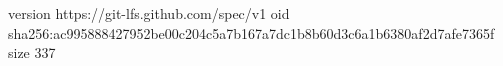 version https://git-lfs.github.com/spec/v1
oid sha256:ac995888427952be00c204c5a7b167a7dc1b8b60d3c6a1b6380af2d7afe7365f
size 337
